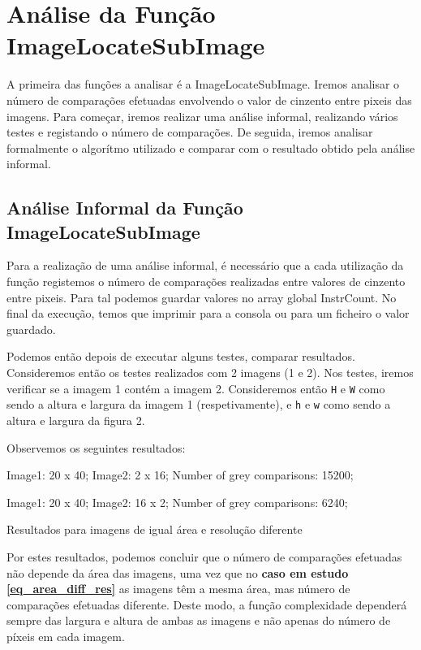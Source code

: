 \renewcommand{\listingscaption}{Caso em estudo:}

\chapter[ImageLocateSubImage]{Análise da Função ImageLocateSubImage}
A primeira das funções a analisar é a ImageLocateSubImage. Iremos analisar o número de comparações efetuadas envolvendo
o valor de cinzento entre pixeis das imagens. Para começar, iremos realizar uma análise informal, realizando vários
testes e registando o número de comparações. De seguida, iremos analisar formalmente o algorítmo utilizado e comparar
com o resultado obtido pela análise informal.

\section[Análise informal]{Análise Informal da Função ImageLocateSubImage
  \label{informal_locate}}
Para a realização de uma análise informal, é necessário que a cada utilização da função registemos o número de
comparações realizadas entre valores de cinzento entre pixeis. Para tal podemos guardar valores no array global
InstrCount. No final da execução, temos que imprimir para a consola ou para um ficheiro o valor guardado.

Podemos então depois de executar alguns testes, comparar resultados. Consideremos então os testes realizados com 2
imagens (1 e 2). Nos testes, iremos verificar se a imagem 1
contém a imagem 2. Consideremos então \verb|H| e \verb|W|
como sendo a altura e
largura da imagem 1 (respetivamente), e \verb|h| e \verb|w|
como sendo a altura e largura da figura 2.

Observemos os seguintes resultados:
\begin{listing}[H]
	\centering
	Image1: 20 x 40;	Image2: 2 x 16;	Number of grey comparisons: 15200;

	Image1: 20 x 40;	Image2: 16 x 2;	Number of grey comparisons: 6240;
	\caption{Resultados para imagens de igual área e resolução
		diferente}
	\label{eq_area_diff_res}
\end{listing}

Por estes resultados, podemos concluir que o número de
comparações efetuadas não depende da área das imagens, uma
vez que no \textbf{caso em estudo \ref{eq_area_diff_res}} as
imagens têm a mesma área, mas número de comparações efetuadas
diferente. Deste modo, a função complexidade dependerá sempre das
largura e altura de ambas as imagens e não apenas do número
de píxeis em cada imagem.

